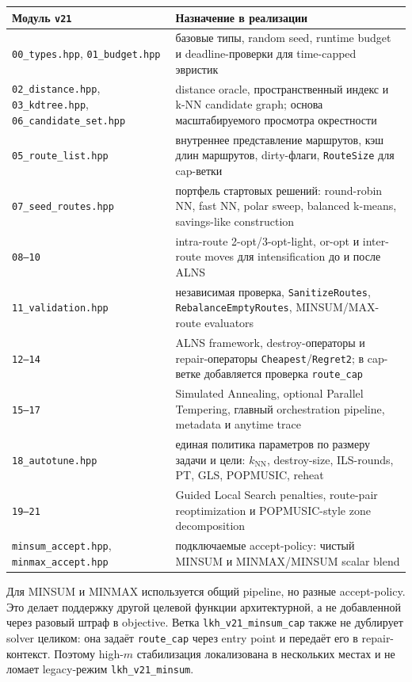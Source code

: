 \documentclass[14pt,a4paper]{extarticle}
\begin{document}
{\scriptsize\setlength{\tabcolsep}{2pt}
\begin{longtable}{>{\raggedright\arraybackslash}p{}>{\raggedright\arraybackslash}p{}}
\toprule
\textbf{Модуль \texttt{v21}} & \textbf{Назначение в реализации}\\
\midrule
\endhead
\texttt{00\_types.hpp}, \texttt{01\_budget.hpp} & базовые типы, random seed, runtime budget и deadline-проверки для time-capped эвристик\\
\texttt{02\_distance.hpp}, \texttt{03\_kdtree.hpp}, \texttt{06\_candidate\_set.hpp} & distance oracle, пространственный индекс и k-NN candidate graph; основа масштабируемого просмотра окрестности\\
\texttt{05\_route\_list.hpp} & внутреннее представление маршрутов, кэш длин маршрутов, dirty-флаги, \texttt{RouteSize} для cap-ветки\\
\texttt{07\_seed\_routes.hpp} & портфель стартовых решений: round-robin NN, fast NN, polar sweep, balanced k-means, savings-like construction\\
\texttt{08--10} & intra-route 2-opt/3-opt-light, or-opt и inter-route moves для intensification до и после ALNS\\
\texttt{11\_validation.hpp} & независимая проверка, \texttt{SanitizeRoutes}, \texttt{RebalanceEmptyRoutes}, MINSUM/MAX-route evaluators\\
\texttt{12--14} & ALNS framework, destroy-операторы и repair-операторы \texttt{Cheapest}/\texttt{Regret2}; в cap-ветке добавляется проверка \texttt{route\_cap}\\
\texttt{15--17} & Simulated Annealing, optional Parallel Tempering, главный orchestration pipeline, metadata и anytime trace\\
\texttt{18\_autotune.hpp} & единая политика параметров по размеру задачи и цели: $k_{\mathrm{NN}}$, destroy-size, ILS-rounds, PT, GLS, POPMUSIC, reheat\\
\texttt{19--21} & Guided Local Search penalties, route-pair reoptimization и POPMUSIC-style zone decomposition\\
\texttt{minsum\_accept.hpp}, \texttt{minmax\_accept.hpp} & подключаемые accept-policy: чистый MINSUM и MINMAX/MINSUM scalar blend\\
\bottomrule
\end{longtable}
}

Для MINSUM и MINMAX используется общий pipeline, но разные accept-policy. Это делает поддержку другой целевой функции архитектурной, а не добавленной через разовый штраф в objective. Ветка \texttt{lkh\_v21\_minsum\_cap} также не дублирует solver целиком: она задаёт \texttt{route\_cap} через entry point и передаёт его в repair-контекст. Поэтому high-$m$ стабилизация локализована в нескольких местах и не ломает legacy-режим \texttt{lkh\_v21\_minsum}.
\end{document}
